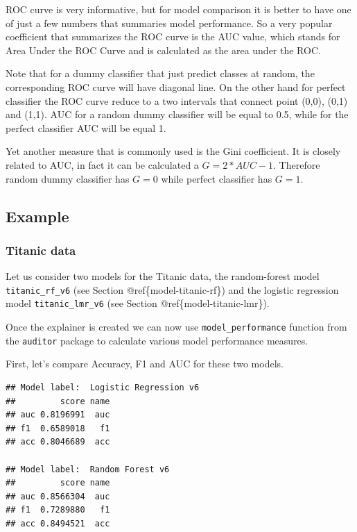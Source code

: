 \documentclass[12pt,]{krantz}
\begin{document}
ROC curve is very informative, but for model comparison it is better to have one of just a few numbers that summaries model performance. So a very popular coefficient that summarizes the ROC curve is the AUC value, which stands for Area Under the ROC Curve and is calculated as the area under the ROC.

Note that for a dummy classifier that just predict classes at random, the corresponding ROC curve will have diagonal line. On the other hand for perfect classifier the ROC curve reduce to a two intervals that connect point (0,0), (0,1) and (1,1). AUC for a random dummy classifier will be equal to 0.5, while for the perfect classifier AUC will be equal 1.

Yet another measure that is commonly used is the Gini coefficient. It is closely related to AUC, in fact it can be calculated a \(G = 2*AUC - 1\). Therefore random dummy classifier has \(G=0\) while perfect classifier has \(G=1\).

\hypertarget{example}{%
\subsection{Example}\label{example}}

\hypertarget{modelPerformanceTitanic}{%
\subsubsection{Titanic data}\label{modelPerformanceTitanic}}

Let us consider two models for the Titanic data, the random-forest model \texttt{titanic\_rf\_v6} (see Section @ref\{model-titanic-rf\}) and the logistic regression model \texttt{titanic\_lmr\_v6} (see Section @ref\{model-titanic-lmr\}).

Once the explainer is created we can now use \texttt{model\_performance} function from the \texttt{auditor} package to calculate various model performance measures.

First, let's compare Accuracy, F1 and AUC for these two models.

\begin{verbatim}
## Model label:  Logistic Regression v6 
##         score name
## auc 0.8196991  auc
## f1  0.6589018   f1
## acc 0.8046689  acc

## Model label:  Random Forest v6 
##         score name
## auc 0.8566304  auc
## f1  0.7289880   f1
## acc 0.8494521  acc
\end{verbatim}
\end{document}

